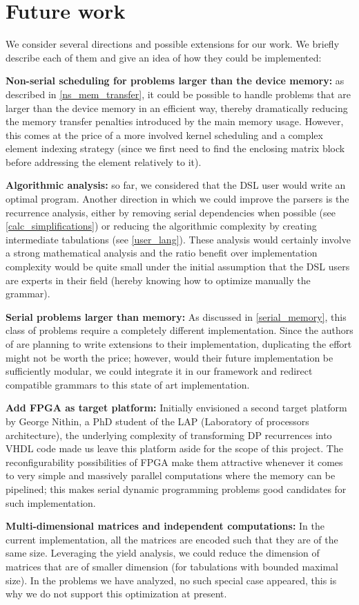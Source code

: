 \documentclass[11pt]{article}
\begin{document}
\section{Future work}
We consider several directions and possible extensions for our work. We briefly describe each of them and give an idea of how they could be implemented:\ol
\item \textbf{Non-serial scheduling for problems larger than the device memory:} as described in \ref{ns_mem_transfer}, it could be possible to handle problems that are larger than the device memory in an efficient way, thereby dramatically reducing the memory transfer penalties introduced by the main memory usage. However, this comes at the price of a more involved kernel scheduling and a complex element indexing strategy (since we first need to find the enclosing matrix block before addressing the element relatively to it).
\item \textbf{Algorithmic analysis:} so far, we considered that the DSL user would write an optimal program. Another direction in which we could improve the parsers is the recurrence analysis, either by removing serial dependencies when possible (see \ref{calc_simplifications}) or reducing the algorithmic complexity by creating intermediate tabulations (see \ref{user_lang}). These analysis would certainly involve a strong mathematical analysis and the ratio benefit over implementation complexity would be quite small under the initial assumption that the DSL users are experts in their field (hereby knowing how to optimize manually the grammar). 
\item \textbf{Serial problems larger than memory:} As discussed in \ref{serial_memory}, this class of problems require a completely different implementation. Since the authors of \cite{swat_mega} are planning to write extensions to their implementation, duplicating the effort might not be worth the price; however, would their future implementation be sufficiently modular, we could integrate it in our framework and redirect compatible grammars to this state of art implementation.
\item \textbf{Add FPGA as target platform:} Initially envisioned a second target platform by George Nithin, a PhD student of the LAP (Laboratory of processors architecture), the underlying complexity of transforming DP recurrences into VHDL code made us leave this platform aside for the scope of this project. The reconfigurability possibilities of FPGA make them attractive whenever it comes to very simple and massively parallel computations where the memory can be pipelined; this makes serial dynamic programming problems good candidates for such implementation.
\item \textbf{Multi-dimensional matrices and independent computations:} In the current implementation, all the matrices are encoded such that they are of the same size. Leveraging the yield analysis, we could reduce the dimension of matrices that are of smaller dimension (for tabulations with bounded maximal size). In the problems we have analyzed, no such special case appeared, this is why we do not support this optimization at present.
\end{document}

